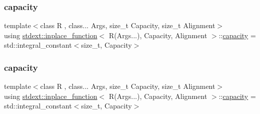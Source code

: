 \mbox{\label{classstdext_1_1inplace__function_3_01R_07Args_8_8_8_08_00_01Capacity_00_01Alignment_01_4_a7aeca8cbeac6770ddbbe3d2de1606119}} 
\subsubsection{\texorpdfstring{capacity}{capacity}\hspace{0.1cm}{\footnotesize\ttfamily [1/2]}}
{\footnotesize\ttfamily template$<$class R , class... Args, size\+\_\+t Capacity, size\+\_\+t Alignment$>$ \\
using \hyperlink{classstdext_1_1inplace__function}{stdext\+::inplace\+\_\+function}$<$ R(Args...), Capacity, Alignment $>$\+::\hyperlink{classstdext_1_1inplace__function_3_01R_07Args_8_8_8_08_00_01Capacity_00_01Alignment_01_4_a7aeca8cbeac6770ddbbe3d2de1606119}{capacity} =  std\+::integral\+\_\+constant$<$size\+\_\+t, Capacity$>$}

\mbox{\label{classstdext_1_1inplace__function_3_01R_07Args_8_8_8_08_00_01Capacity_00_01Alignment_01_4_a7aeca8cbeac6770ddbbe3d2de1606119}} 
\subsubsection{\texorpdfstring{capacity}{capacity}\hspace{0.1cm}{\footnotesize\ttfamily [2/2]}}
{\footnotesize\ttfamily template$<$class R , class... Args, size\+\_\+t Capacity, size\+\_\+t Alignment$>$ \\
using \hyperlink{classstdext_1_1inplace__function}{stdext\+::inplace\+\_\+function}$<$ R(Args...), Capacity, Alignment $>$\+::\hyperlink{classstdext_1_1inplace__function_3_01R_07Args_8_8_8_08_00_01Capacity_00_01Alignment_01_4_a7aeca8cbeac6770ddbbe3d2de1606119}{capacity} =  std\+::integral\+\_\+constant$<$size\+\_\+t, Capacity$>$}




